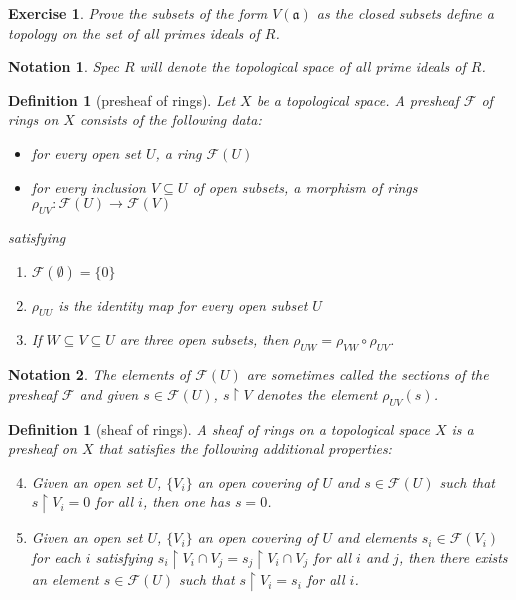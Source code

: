 \documentclass[12pt]{report}
\newtheorem{definition}[proposition]{Definition}
\newtheorem{ex}[proposition]{Exercise}
\newtheorem{notation}{Notation}
\begin{document}
\begin{ex}
	Prove the subsets of the form $V(\mathfrak{a})$ as the closed subsets define a topology on the set of all primes ideals of $R$. 
\end{ex}

\begin{notation}
	Spec $R$ will denote the topological space of all prime ideals of $R$.
\end{notation}

\begin{definition}[presheaf of rings]
	Let $X$ be a topological space. A presheaf $\mathscr{F}$ of rings on $X$ consists of the following data:
	\begin{itemize}
		\item for every open set $U$, a ring $\mathscr{F}(U)$
		\item for every inclusion $V \subseteq U$ of open subsets, a morphism of rings $\rho_{UV}: \mathscr{F}(U) \rightarrow \mathscr{F}(V)$  
	\end{itemize}
satisfying 
	\begin{enumerate}
		\item $\mathscr{F}(\emptyset) = \lbrace 0 \rbrace$
		\item $\rho_{UU}$ is the identity map for every open subset $U$
		\item  If $W \subseteq V \subseteq U$ are three open subsets, then $\rho_{UW} = \rho_{VW} \circ \rho_{UV}$.
	\end{enumerate}
\end{definition}

\begin{notation}
	The elements of $\mathscr{F}(U)$ are sometimes called the sections of the presheaf $\mathscr{F}$ and given $s \in \mathscr{F}(U)$, $s\restriction V$ denotes the element $\rho_{UV}(s)$.
\end{notation}	

\begin{definition}[sheaf of rings]
	A sheaf of rings on a topological space $X$ is a presheaf on $X$ that satisfies the following additional properties:
	\begin{enumerate}
	\setcounter{enumi}{3}
		\item Given an open set $U$, $\lbrace V_i \rbrace$ an open covering of $U$ and $s \in \mathscr{F}(U)$ such that $s \restriction V_i = 0$ for all $i$, then one has $s = 0$.
		\item Given an open set $U$, $\lbrace V_i \rbrace$ an open covering of $U$ and elements $s_i \in \mathscr{F}(V_i)$ for each $i$ satisfying $s_i \restriction V_i \cap V_j = s_j \restriction V_i \cap V_j$ for all $i$ and $j$, then there exists an element $s \in \mathscr{F}(U)$ such that $s \restriction V_i = s_i$ for all $i$.  
	\end{enumerate}	
\end{definition}
\end{document}
